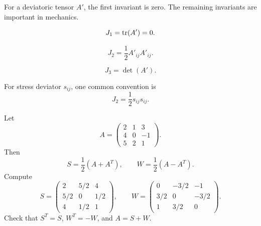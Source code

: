 \documentclass{otscience}
\begin{document}
For a deviatoric tensor \(A'\), the first invariant is zero. The remaining invariants are important in mechanics.

\begin{formulabox}
    \[
        J_1=\operatorname{tr}(A')=0.
    \]

    \[
        J_2=\frac12A'_{ij}A'_{ij}.
    \]

    \[
        J_3=\det(A').
    \]

    For stress deviator \(s_{ij}\), one common convention is
    \[
        J_2=\frac12s_{ij}s_{ij}.
    \]
\end{formulabox}

\begin{exampleboxnosplit}
    Let
    \[
        A=\begin{pmatrix}
            2 & 1 & 3  \\
            4 & 0 & -1 \\
            5 & 2 & 1
        \end{pmatrix}.
    \]
    Then
    \[
        S=\frac12(A+A^T),
        \qquad
        W=\frac12(A-A^T).
    \]
    Compute
    \[
        S=\begin{pmatrix}
            2   & 5/2 & 4   \\
            5/2 & 0   & 1/2 \\
            4   & 1/2 & 1
        \end{pmatrix},
        \qquad
        W=\begin{pmatrix}
            0   & -3/2 & -1   \\
            3/2 & 0    & -3/2 \\
            1   & 3/2  & 0
        \end{pmatrix}.
    \]
    Check that \(S^T=S\), \(W^T=-W\), and \(A=S+W\).
\end{exampleboxnosplit}
\end{document}
